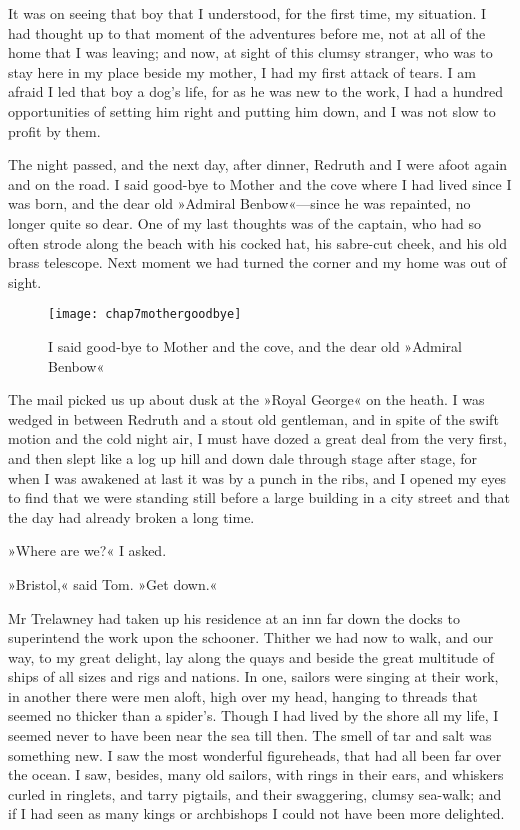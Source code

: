 It was on seeing that boy that I understood, for the first time, my situation. I had thought up to that moment of the adventures before me, not at all of the home that I was leaving; and now, at sight of this clumsy stranger, who was to stay here in my place beside my mother, I had my first attack of tears. I am afraid I led that boy a dog's life, for as he was new to the work, I had a hundred opportunities of setting him right and putting him down, and I was not slow to profit by them.

 

The night passed, and the next day, after dinner, Redruth and I were afoot again and on the road. I said good-bye to Mother and the cove where I had lived since I was born, and the dear old »Admiral Benbow«—since he was repainted, no longer quite so dear. One of my last thoughts was of the captain, who had so often strode along the beach with his cocked hat, his sabre-cut cheek, and his old brass telescope. Next moment we had turned the corner and my home was out of sight.

\begin{figure}[p]
\centering
\texttt{[image: chap7mothergoodbye]}
\caption[I said good-bye to Mother]{I said good-bye to Mother and the cove, and the dear old »Admiral Benbow«}
\end{figure}


The mail picked us up about dusk at the »Royal George« on the heath. I was wedged in between Redruth and a stout old gentleman, and in spite of the swift motion and the cold night air, I must have dozed a great deal from the very first, and then slept like a log up hill and down dale through stage after stage, for when I was awakened at last it was by a punch in the ribs, and I opened my eyes to find that we were standing still before a large building in a city street and that the day had already broken a long time.

»Where are we?« I asked.

»Bristol,« said Tom. »Get down.«

Mr Trelawney had taken up his residence at an inn far down the docks to superintend the work upon the schooner. Thither we had now to walk, and our way, to my great delight, lay along the quays and beside the great multitude of ships of all sizes and rigs and nations. In one, sailors were singing at their work, in another there were men aloft, high over my head, hanging to threads that seemed no thicker than a spider's. Though I had lived by the shore all my life, I seemed never to have been near the sea till then. The smell of tar and salt was something new. I saw the most wonderful figureheads, that had all been far over the ocean. I saw, besides, many old sailors, with rings in their ears, and whiskers curled in ringlets, and tarry pigtails, and their swaggering, clumsy sea-walk; and if I had seen as many kings or archbishops I could not have been more delighted.

